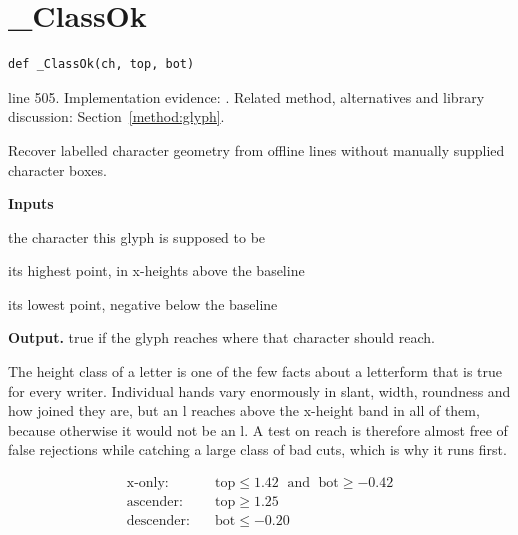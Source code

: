 \section{\_ClassOk}\label{fn:style:-ClassOk}
\begin{lstlisting}[style=sig]
def _ClassOk(ch, top, bot)
\end{lstlisting}
 line 505. Implementation evidence: \cite{code2026}. Related method, alternatives and library discussion: Section~\ref{method:glyph}.


Recover labelled character geometry from offline lines without manually supplied character boxes.




\noindent\textbf{Inputs}
\begin{description}[leftmargin=2.2em,style=nextline,font=\normalfont\ttfamily]\setlength\itemsep{1pt}
  \item[{ch}] \normalfont the character this glyph is supposed to be
  \item[{top}] \normalfont its highest point, in x-heights above the baseline
  \item[{bot}] \normalfont its lowest point, negative below the baseline
\end{description}

\noindent\textbf{Output.} true if the glyph reaches where that character should reach.


The height class of a letter is one of the few facts about a letterform that is true for every writer. Individual hands vary enormously in slant, width, roundness and how joined they are, but an l reaches above the x-height band in all of them, because otherwise it would not be an l. A test on reach is therefore almost free of false rejections while catching a large class of bad cuts, which is why it runs first.



\begin{equation}
\begin{aligned}\text{x-only:} \quad & \mathrm{top} \le 1.42 \;\text{ and }\; \mathrm{bot} \ge -0.42 \\[2pt]\text{ascender:} \quad & \mathrm{top} \ge 1.25 \\[2pt]\text{descender:} \quad & \mathrm{bot} \le -0.20\end{aligned}
\end{equation}

